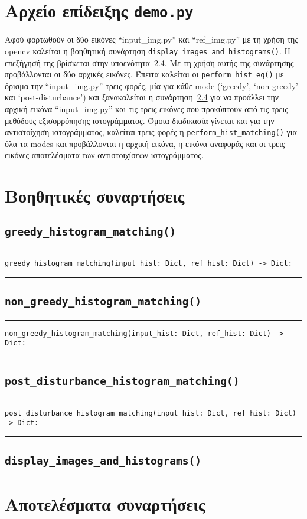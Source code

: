 \documentclass{article}
\begin{document}
\section{Αρχείο επίδειξης \texttt{demo.py}}
Αφού φορτωθούν οι δύο εικόνες ``input\_img.py'' και ``ref\_img.py'' με τη χρήση 
της opencv καλείται η βοηθητική συνάρτηση \verb|display_images_and_histograms()|.
Η επεξήγησή της βρίσκεται στην υποενότητα~\ref{helpfunc-display}. Με τη χρήση 
αυτής της συνάρτησης προβάλλονται οι δύο αρχικές εικόνες. Έπειτα καλείται οι
\verb|perform_hist_eq()| με όρισμα την ``input\_img.py'' τρεις φορές, μία
για κάθε mode (`greedy', `non-greedy' και `post-disturbance') και ξανακαλείται η
συνάρτηση~\ref{helpfunc-display} για να προάλλει την αρχική εικόνα ``input\_img.py''
και τις τρεις εικόνες που προκύπτουν από τις τρεις μεθόδους εξισορρόπησης 
ιστογράμματος. Όμοια διαδικασία γίνεται και για την αντιστοίχηση ιστογράμματος, 
καλείται τρεις φορές η \verb|perform_hist_matching()| για όλα τα modes και 
προβά\-λλονται η αρχική εικόνα, η εικόνα αναφοράς και οι τρεις εικόνες-αποτελέσματα 
των αντιστοιχίσεων ιστογράμ\-ματος.

\section{Βοηθητικές συναρτήσεις}
\subsection{\texttt{greedy\_histogram\_matching()}}\label{helpfunc-greedy}
\hrule
\vspace{1em}
\begin{verbatim}
greedy_histogram_matching(input_hist: Dict, ref_hist: Dict) -> Dict:
\end{verbatim}
\hrule
\vspace{1em}


\subsection{\texttt{non\_greedy\_histogram\_matching()}}\label{helpfunc-nongreedy}
\hrule
\vspace{1em}
\begin{verbatim}
non_greedy_histogram_matching(input_hist: Dict, ref_hist: Dict) -> Dict:
\end{verbatim}
\hrule
\vspace{1em}

\subsection{\texttt{post\_disturbance\_histogram\_matching()}}\label{helpfunc-post}
\hrule
\vspace{1em}
\begin{verbatim}
post_disturbance_histogram_matching(input_hist: Dict, ref_hist: Dict) -> Dict:
\end{verbatim}
\hrule
\vspace{1em}

\subsection{\texttt{display\_images\_and\_histograms()}}\label{helpfunc-display}
\section{Αποτελέσματα συναρτήσεις}
\end{document}
